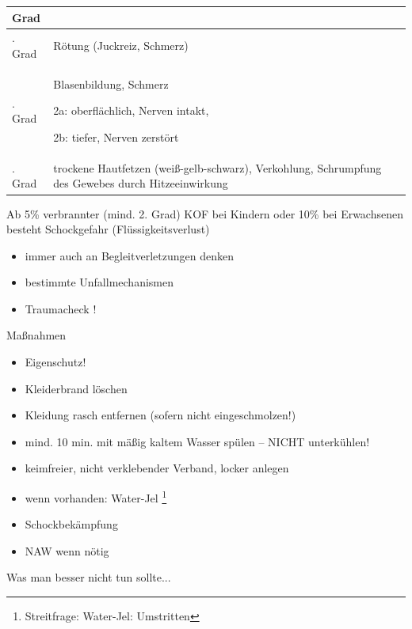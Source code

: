 \documentclass{article}
\begin{document}
\begin{flushleft}
\begin{tabular}{|m{1.836cm}|m{6.8980002cm}|m{4.3630004cm}|}
\hline
\centering Grad\par

 &
 &
\\\hline
\centering 1. Grad\par

 &
R\"otung (Juckreiz, Schmerz)

 &
\\\hline
\centering 2. Grad\par

 &
Blasenbildung, Schmerz

2a: oberfl\"achlich, Nerven intakt, 

2b: tiefer, Nerven zerst\"ort

 &
\\\hline
\centering 3. Grad\par

 &
trockene Hautfetzen (wei{\ss}-gelb-schwarz), Verkohlung, Schrumpf\-ung
des Gewebes durch Hitze\-ein\-wirkung

 &
\\\hline
\end{tabular}
\end{flushleft}
Ab 5\% verbrannter (mind. 2. Grad) KOF bei Kindern oder 10\% bei
Erwachsenen besteht Schockgefahr (Fl\"ussigkeitsverlust)

\begin{itemize}
\item immer  auch an Begleitverletzungen  denken

\item bestimmte Unfallmechanismen

\item Traumacheck !

\end{itemize}
Ma{\ss}nahmen

\begin{itemize}
\item Eigenschutz!

\item Kleiderbrand l\"oschen

\item Kleidung rasch entfernen (sofern nicht  eingeschmolzen!)

\item mind. 10 min. mit m\"a{\ss}ig kaltem Wasser  sp\"ulen -- NICHT
unterk\"uhlen!

\item keimfreier, nicht verklebender Verband, locker anlegen 

\item wenn vorhanden: Water-Jel%
%
\footnote{Streitfrage: Water-Jel: Umstritten} 

\item Schockbek\"ampfung

\item NAW wenn n\"otig

\end{itemize}
Was man besser nicht tun sollte...
\end{document}
